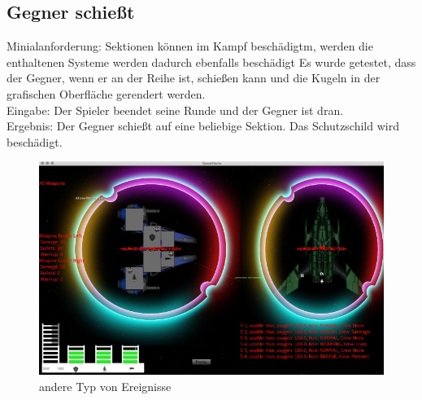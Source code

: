 \documentclass[12pt]{article}
\begin{document}
\subsection{Gegner schießt}
Minialanforderung: Sektionen können im Kampf beschädigtm, werden die enthaltenen Systeme werden dadurch ebenfalls beschädigt
Es wurde getestet, dass der Gegner, wenn er an der Reihe ist, schießen kann und die Kugeln in der grafischen Oberfläche gerendert werden.\\
Eingabe: Der Spieler beendet seine Runde und der Gegner ist dran.\\
Ergebnis: Der Gegner schießt auf eine beliebige Sektion. Das Schutzschild wird beschädigt.\\
\begin{figure}[htp]
\centering
\includegraphics[scale=0.7]{TestProtocolBilder/OptimizedgegnerShots.png}
\caption{andere Typ von Ereignisse}
\end{figure}


\newpage
\end{document}
